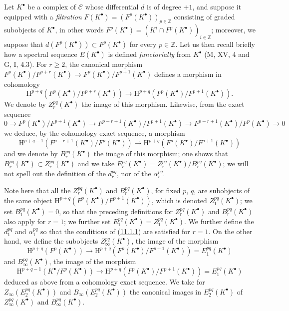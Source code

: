 \begin{env}[11.2.2]
\label{0.11.2.2}
Let $K^\bullet$ be a complex of $\mathcal C$ whose differential
$d$ is of degree $+1$, and suppose it equipped with a \emph{filtration}
$F(K^\bullet)=(F^p(K^\bullet))_{p\in\mathbb Z}$ consisting of graded subobjects
of $K^\bullet$, in other words
$F^p(K^\bullet)=(K^i\cap F^p(K^\bullet))_{i\in\mathbb Z}$; moreover, we
suppose that $d(F^p(K^\bullet))\subset F^p(K^\bullet)$ for every
$p\in\mathbb Z$. Let us then recall briefly how a spectral sequence
$E(K^\bullet)$ is defined \emph{functorially} from
$K^\bullet$ (M, XV, 4 and G, I, 4.3). For $r\geq2$, the canonical morphism
$F^p(K^\bullet)/F^{p+r}(K^\bullet)\to
F^p(K^\bullet)/F^{p+1}(K^\bullet)$ defines a morphism in cohomology
\[
  \mathrm H^{p+q}(F^p(K^\bullet)/F^{p+r}(K^\bullet))
  \longrightarrow
  \mathrm H^{p+q}(F^p(K^\bullet)/F^{p+1}(K^\bullet)).
\]
We denote by $Z_r^{pq}(K^\bullet)$ the image of this morphism. Likewise, from the
exact sequence
\[
  0\to F^p(K^\bullet)/F^{p+1}(K^\bullet)
  \to F^{p-r+1}(K^\bullet)/F^{p+1}(K^\bullet)
  \to F^{p-r+1}(K^\bullet)/F^p(K^\bullet)\to0
\]
we deduce, by the cohomology exact sequence, a morphism
\[
  \mathrm H^{p+q-1}(F^{p-r+1}(K^\bullet)/F^p(K^\bullet))
  \longrightarrow
  \mathrm H^{p+q}(F^p(K^\bullet)/F^{p+1}(K^\bullet))
\]
and we denote by $B_r^{pq}(K^\bullet)$ the image of this morphism; one shows
that $B_r^{pq}(K^\bullet)\subset Z_r^{pq}(K^\bullet)$ and we take
$E_r^{pq}(K^\bullet)=Z_r^{pq}(K^\bullet)/B_r^{pq}(K^\bullet)$; we will not
spell out the definition of the $d_r^{pq}$, nor of the $\alpha_r^{pq}$.

Note here that all the $Z_r^{pq}(K^\bullet)$ and
$B_r^{pq}(K^\bullet)$, for fixed $p$, $q$, are subobjects of the same
object
$\mathrm H^{p+q}(F^p(K^\bullet)/F^{p+1}(K^\bullet))$, which is denoted
$Z_1^{pq}(K^\bullet)$; we set $B_1^{pq}(K^\bullet)=0$, so that the
preceding definitions for $Z_r^{pq}(K^\bullet)$ and
$B_r^{pq}(K^\bullet)$ also apply for $r=1$; we further set
$E_1^{pq}(K^\bullet)=Z_1^{pq}(K^\bullet)$. We further define the $d_1^{pq}$
and $\alpha_1^{pq}$ so that the conditions of
(\hyperref[0.11.1.1]{11.1.1}) are satisfied for $r=1$. On the other hand,
we define the subobjects $Z_\infty^{pq}(K^\bullet)$, the image of the morphism
\[
  \mathrm H^{p+q}(F^p(K^\bullet))\longrightarrow
  \mathrm H^{p+q}(F^p(K^\bullet)/F^{p+1}(K^\bullet))
  =E_1^{pq}(K^\bullet)
\]
and $B_\infty^{pq}(K^\bullet)$, the image of the morphism
\[
  \mathrm H^{p+q-1}(K^\bullet/F^p(K^\bullet))\longrightarrow
  \mathrm H^{p+q}(F^p(K^\bullet)/F^{p+1}(K^\bullet))
  =E_1^{pq}(K^\bullet)
\]
deduced as above from a cohomology exact sequence. We take for
$Z_\infty(E_2^{pq}(K^\bullet))$ and $B_\infty(E_2^{pq}(K^\bullet))$ the
canonical images in $E_2^{pq}(K^\bullet)$ of
$Z_\infty^{pq}(K^\bullet)$ and $B_\infty^{pq}(K^\bullet)$.


\end{env}
